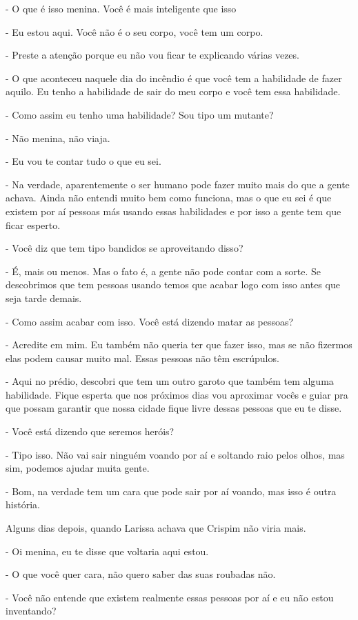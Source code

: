 - O que é isso menina. Você é mais inteligente que isso

- Eu estou aqui. Você não é o seu corpo, você tem um corpo.

- Preste a atenção porque eu não vou ficar te explicando várias vezes.

- O que aconteceu naquele dia do incêndio é que você tem a habilidade de fazer aquilo. Eu tenho a habilidade de sair do meu corpo e você tem essa habilidade.

- Como assim eu tenho uma habilidade? Sou tipo um mutante?

- Não menina, não viaja.

- Eu vou te contar tudo o que eu sei.

- Na verdade, aparentemente o ser humano pode fazer muito mais do que a gente achava. Ainda não entendi muito bem como funciona, mas o que eu sei é que existem por aí pessoas más usando essas habilidades e por isso a gente tem que ficar esperto.

- Você diz que tem tipo bandidos se aproveitando disso?

- É, mais ou menos. Mas o fato é, a gente não pode contar com a sorte. Se descobrimos que tem pessoas usando temos que acabar logo com isso antes que seja tarde demais.

- Como assim acabar com isso. Você está dizendo matar as pessoas?

- Acredite em mim. Eu também não queria ter que fazer isso, mas se não fizermos elas podem causar muito mal. Essas pessoas não têm escrúpulos.

- Aqui no prédio, descobri que tem um outro garoto que também tem alguma habilidade. Fique esperta que nos próximos dias vou aproximar vocês e guiar pra que possam garantir que nossa cidade fique livre dessas pessoas que eu te disse.

- Você está dizendo que seremos heróis?

- Tipo isso. Não vai sair ninguém voando por aí e soltando raio pelos olhos, mas sim, podemos ajudar muita gente.

- Bom, na verdade tem um cara que pode sair por aí voando, mas isso é outra história.

Alguns dias depois, quando Larissa achava que Crispim não viria mais.

- Oi menina, eu te disse que voltaria aqui estou.

- O que você quer cara, não quero saber das suas roubadas não.

- Você não entende que existem realmente essas pessoas por aí e eu não estou inventando?

